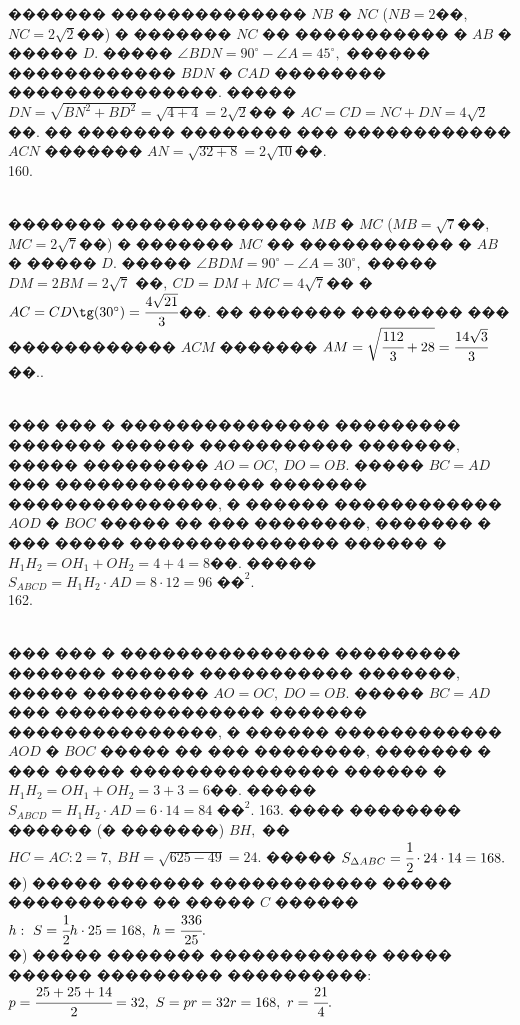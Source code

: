 \documentclass[12pt]{article}
\begin{document}
������� �������������� $NB$ � $NC$ ($NB=2$��, $NC=2\sqrt{2}$��) � ������� $NC$ �� ����������� � $AB$ � ����� $D.$ ����� $\angle BDN=90^\circ-\angle A=45^\circ,$ ������ ������������ $BDN$ � $CAD$ �������� ���������������. ����� $DN=\sqrt{BN^2+BD^2}=\sqrt{4+4}=2\sqrt{2}$�� � $AC=CD=NC+DN=4\sqrt{2}$��. �� ������� �������� ��� ������������ $ACN$ ������� $AN=\sqrt{32+8}=2\sqrt{10}$��.\\
160. \begin{figure}[ht!]
\end{figure}\\
������� �������������� $MB$ � $MC$ ($MB=\sqrt{7}$��, $MC=2\sqrt{7}$��) � ������� $MC$ �� ����������� � $AB$ � ����� $D.$ ����� $\angle BDM=90^\circ-\angle A=30^\circ,$ ����� $DM=2BM=2\sqrt{7}\text{ ��},\ CD=DM+MC=4\sqrt{7}$�� � $AC=CD\tg(30^\circ)=\cfrac{4\sqrt{21}}{3}$��. �� ������� �������� ��� ������������ $ACM$ ������� $AM=\sqrt{\cfrac{112}{3}+28}=\cfrac{14\sqrt{3}}{3}$��.\newpage{}. \begin{figure}[ht!]
\end{figure}\\
��� ��� � ��������������� ��������� ������� ������ ����������� �������, ����� ��������� $AO=OC,\ DO=OB.$ ����� $BC=AD$ ��� ��������������� ������� ���������������, � ������ ������������ $AOD$ � $BOC$ ����� �� ��� ��������, ������� � ��� ����� ��������������� ������ � $H_1H_2=OH_1+OH_2=4+4=8$��. ����� $S_{ABCD}=H_1H_2\cdot AD=8\cdot12=96\text{ ��}^2.$\\
162. \begin{figure}[ht!]
\end{figure}\\
��� ��� � ��������������� ��������� ������� ������ ����������� �������, ����� ��������� $AO=OC,\ DO=OB.$ ����� $BC=AD$ ��� ��������������� ������� ���������������, � ������ ������������ $AOD$ � $BOC$ ����� �� ��� ��������, ������� � ��� ����� ��������������� ������ � $H_1H_2=OH_1+OH_2=3+3=6$��. ����� $S_{ABCD}=H_1H_2\cdot AD=6\cdot14=84\text{ ��}^2.$
163. ���� �������� ������ (� �������) $BH,$ �� $HC=AC:2=7,\ BH=\sqrt{625-49}=24.$ ����� $S_{\Delta ABC}=\cfrac{1}{2}\cdot24\cdot14=168.$\\
�) ����� ������� ������������ ����� ���������� �� ����� $C$ ������ $h:\ S=\cfrac{1}{2}h\cdot25=168,\ h=\cfrac{336}{25}.$\\
�) ����� ������� ������������ ����� ������ ��������� ����������: $p=\cfrac{25+25+14}{2}=32,\ S=pr=32r=168,\ r=\cfrac{21}{4}.$\\
\end{document}
